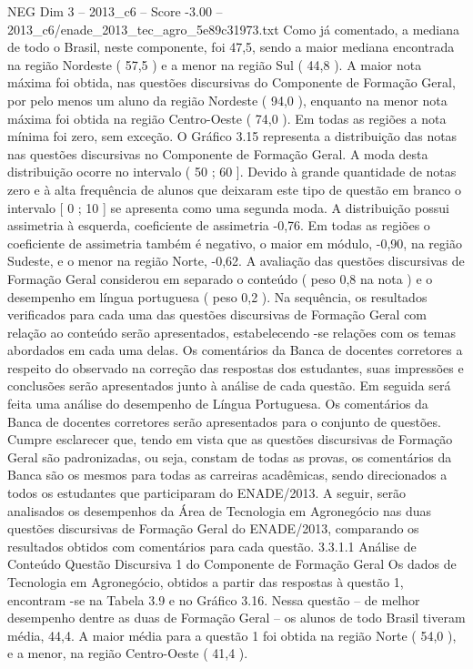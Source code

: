 \begin{textsample}{NEG Dim 3 – 2013\_c6 – Score -3.00 – 2013\_c6/enade\_2013\_tec\_agro\_5e89c31973.txt}
Como já comentado, a mediana de todo o Brasil, neste componente, foi 47,5, sendo a maior mediana encontrada na região Nordeste ( 57,5 ) e a menor na região Sul ( 44,8 ).
A maior nota máxima foi obtida, nas questões discursivas do Componente de Formação Geral, por pelo menos um aluno da região Nordeste ( 94,0 ), enquanto na menor nota máxima foi obtida na região Centro-Oeste ( 74,0 ).
Em todas as regiões a nota mínima foi zero, sem exceção.
O Gráfico 3.15 representa a distribuição das notas nas questões discursivas no Componente de Formação Geral.
A moda desta distribuição ocorre no intervalo ( 50 ; 60 ].
Devido à grande quantidade de notas zero e à alta frequência de alunos que deixaram este tipo de questão em branco o intervalo [ 0 ; 10 ] se apresenta como uma segunda moda.
A distribuição possui assimetria à esquerda, coeficiente de assimetria -0,76.
Em todas as regiões o coeficiente de assimetria também é negativo, o maior em módulo, -0,90, na região Sudeste, e o menor na região Norte, -0,62.
A avaliação das questões discursivas de Formação Geral considerou em separado o conteúdo ( peso 0,8 na nota ) e o desempenho em língua portuguesa ( peso 0,2 ).
Na sequência, os resultados verificados para cada uma das questões discursivas de Formação Geral com relação ao conteúdo serão apresentados, estabelecendo -se relações com os temas abordados em cada uma delas.
Os comentários da Banca de docentes corretores a respeito do observado na correção das respostas dos estudantes, suas impressões e conclusões serão apresentados junto à análise de cada questão.
Em seguida será feita uma análise do desempenho de Língua Portuguesa.
Os comentários da Banca de docentes corretores serão apresentados para o conjunto de questões.
Cumpre esclarecer que, tendo em vista que as questões discursivas de Formação Geral são padronizadas, ou seja, constam de todas as provas, os comentários da Banca são os mesmos para todas as carreiras acadêmicas, sendo direcionados a todos os estudantes que participaram do ENADE/2013.
A seguir, serão analisados os desempenhos da Área de Tecnologia em Agronegócio nas duas questões discursivas de Formação Geral do ENADE/2013, comparando os resultados obtidos com comentários para cada questão. 3.3.1.1 Análise de Conteúdo Questão Discursiva 1 do Componente de Formação Geral Os dados de Tecnologia em Agronegócio, obtidos a partir das respostas à questão 1, encontram -se na Tabela 3.9 e no Gráfico 3.16.
Nessa questão – de melhor desempenho dentre as duas de Formação Geral – os alunos de todo Brasil tiveram média, 44,4.
A maior média para a questão 1 foi obtida na região Norte ( 54,0 ), e a menor, na região Centro-Oeste ( 41,4 ).

\end{textsample}
